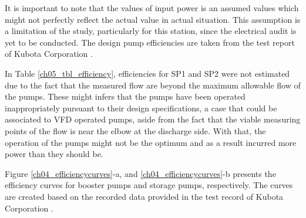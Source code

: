 It is important to note that the values of input power is an assumed values which might not perfectly reflect the actual value in actual situation. This assumption is a limitation of the study, particularly for this station, since the electrical audit is yet to be conducted. The design pump efficiencies are taken from the test report of Kubota Corporation \cite{Kubota2010}. 

In Table \ref{ch05_tbl_efficiency}, efficiencies for SP1 and SP2 were not estimated due to the fact that the measured flow are beyond the maximum allowable flow of the pumps. These might infers that the pumps have been operated inappropriately pursuant to their design specifications, a case that could be associated to VFD operated pumps, aside from the fact that the viable measuring points of the flow is near the elbow at the discharge side. With that, the operation of the pumps might not be the optimum and as a result incurred more power than they should be. 

Figure \ref{ch04_efficiencycurves}-a, and \ref{ch04_efficiencycurves}-b presents the efficiency curves for booster pumps and storage pumps, respectively. The curves are created based on the recorded data provided in the test record of Kubota Corporation \cite{Kubota2010}. 



